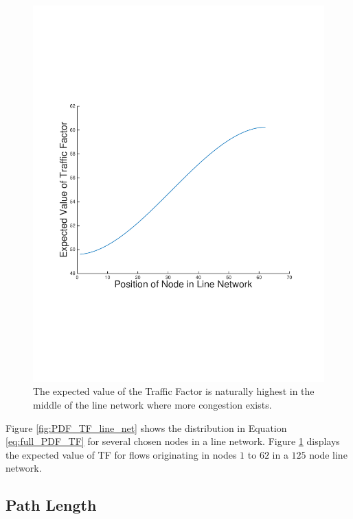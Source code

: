 \begin{figure}
\begin{centering}
    \includegraphics[scale=0.4, clip=true, trim=15mm 65mm 20mm 65mm]{figures/EV_TF_line_net_125.pdf}
    \caption{The expected value of the Traffic Factor is naturally highest in the middle of the line network where more congestion exists.}
    \label{fig:EV_TF_line_net}
\end{centering}
\end{figure}

Figure \ref{fig:PDF_TF_line_net} shows the distribution in Equation \ref{eq:full_PDF_TF} for several chosen nodes in a line network.  Figure \ref{fig:EV_TF_line_net} displays the expected value of TF for flows originating in nodes $1$ to $62$ in a $125$ node line network.  

\subsection{Path Length}


